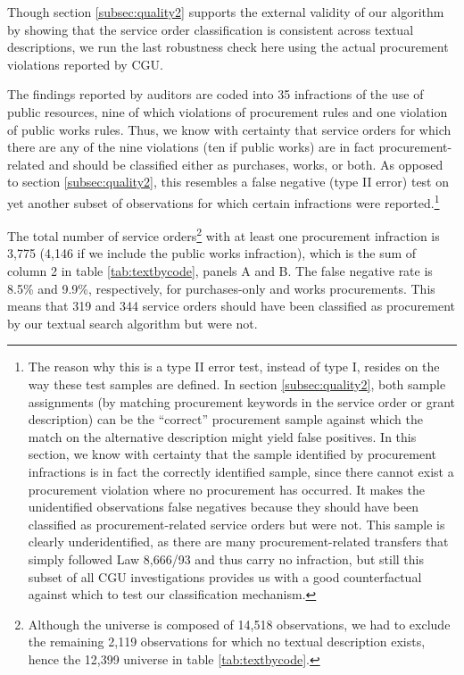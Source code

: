 \documentclass[11pt]{article}
\begin{document}
Though section \ref{subsec:quality2} supports the external validity of our algorithm by showing that the service order classification is consistent across textual descriptions, we run the last robustness check here using the actual procurement violations reported by CGU.

The findings reported by auditors are coded into 35 infractions of the use of public resources, nine of which violations of procurement rules and one violation of public works rules. Thus, we know with certainty that service orders for which there are any of the nine violations (ten if public works) are in fact procurement-related and should be classified either as purchases, works, or both. As opposed to section \ref{subsec:quality2}, this resembles a false negative (type II error) test on yet another subset of observations for which certain infractions were reported.\footnote{The reason why this is a type II error test, instead of type I, resides on the way these test samples are defined. In section \ref{subsec:quality2}, both sample assignments (by matching procurement keywords in the service order or grant description) can be the ``correct'' procurement sample against which the match on the alternative description might yield false positives. In this section, we know with certainty that the sample identified by procurement infractions is in fact the correctly identified sample, since there cannot exist a procurement violation where no procurement has occurred. It makes the unidentified observations false negatives because they should have been classified as procurement-related service orders but were not. This sample is clearly underidentified, as there are many procurement-related transfers that simply followed Law 8,666/93 and thus carry no infraction, but still this subset of all CGU investigations provides us with a good counterfactual against which to test our classification mechanism.}


The total number of service orders\footnote{Although the universe is composed of 14,518 observations, we had to exclude the remaining 2,119 observations for which no textual description exists, hence the 12,399 universe in table \ref{tab:textbycode}.} with at least one procurement infraction is 3,775 (4,146 if we include the public works infraction), which is the sum of column 2 in table \ref{tab:textbycode}, panels A and B. The false negative rate is 8.5\% and 9.9\%, respectively, for purchases-only and works procurements. This means that 319 and 344 service orders should have been classified as procurement by our textual search algorithm but were not.
\end{document}
